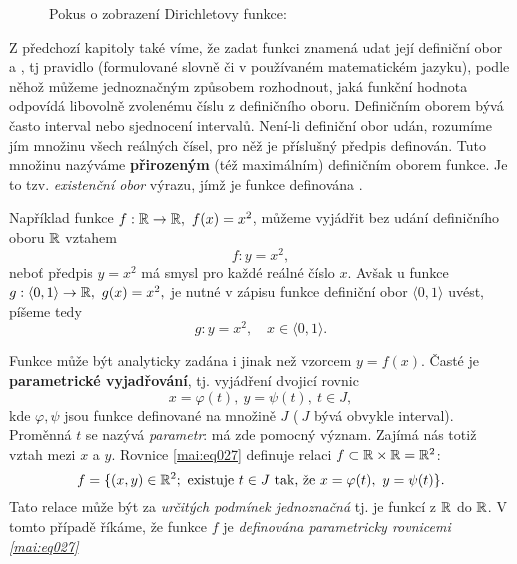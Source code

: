 {      \begin{figure}[ht!] %
        \centering
        
        \caption{Pokus o zobrazení Dirichletovy funkce: }
        \label{mai_fig005}
      \end{figure}      
      Z předchozí kapitoly také víme, že zadat funkci znamená udat její definiční obor a 
      , tj pravidlo (formulované slovně či v používaném matematickém 
      jazyku), podle něhož můžeme jednoznačným způsobem rozhodnout, jaká funkční hodnota odpovídá 
      libovolně zvolenému číslu z definičního oboru. Definičním oborem bývá často interval nebo 
      sjednocení intervalů. Není-li definiční obor udán, rozumíme jím množinu všech reálných čísel, 
      pro něž je příslušný předpis definován. Tuto množinu nazýváme \textbf{přirozeným} (též 
      maximálním) definičním oborem funkce. Je to tzv. \emph{existenční obor} výrazu, jímž je 
      funkce definována \cite[s.~84]{Brabec1989}.
      
      Například funkce $f: \mathbb{R}\rightarrow\mathbb{R},\ f(x)=x^2$, můžeme vyjádřit bez udání 
      definičního oboru $\mathbb{R}$ vztahem 
      \begin{equation*}
        f: y=x^2,
      \end{equation*}
      neboť předpis $y=x^2$ má smysl pro každé reálné číslo $x$. Avšak u funkce $g:\langle0, 
      1\rangle\rightarrow\mathbb{R},\ g(x)=x^2,$ je nutné v zápisu funkce definiční obor $\langle0, 
      1\rangle$ 
      uvést, píšeme tedy   
      \begin{equation*}
        g: y=x^2, \quad x\in\langle0,1\rangle.
      \end{equation*}
       
        
      
        
      
      Funkce může být analyticky zadána i jinak než vzorcem $y=f(x)$. Časté je \textbf{parametrické 
      vyjadřování}, tj. vyjádření dvojicí rovnic 
      \begin{equation}\label{mai:eq027}
        x=\varphi(t),\ y=\psi(t),\ t\in J,
      \end{equation}
      kde $\varphi, \psi$ jsou funkce definované na množině $J$ ($\ J$ bývá obvykle interval). 
      Proměnná $t$ se nazývá \emph{parametr}: má zde pomocný význam. Zajímá nás totiž vztah mezi 
      $x$ a $y$. Rovnice \ref{mai:eq027} definuje relaci 
      $f\subset\mathbb{R}\times\mathbb{R}=\mathbb{R}^2$:
      \begin{equation*}
        f = \{(x,y)\in\mathbb{R}^2; \text{ existuje } t\in J \text{ tak, že } x=\varphi(t),\ y=\psi(t)\}.
      \end{equation*}      
      Tato relace může být za \emph{určitých podmínek jednoznačná} tj. je funkcí z $\mathbb{R}$ do 
      $\mathbb{R}$. V tomto případě říkáme, že funkce $f$ je \emph{definována parametricky rovnicemi 
      \ref{mai:eq027}}
      
}
